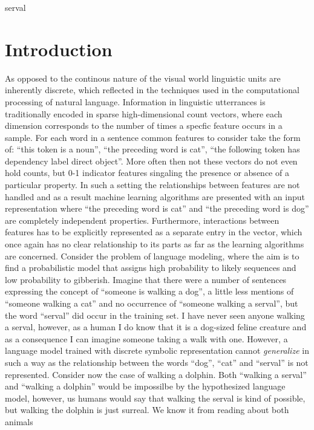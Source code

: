 
serval
\chapter{Introduction}
\label{introduction}
As opposed to the continous nature of the visual world linguistic units are inherently
discrete, which reflected in the techniques used in the computational processing
of natural language. Information in linguistic utterrances is traditionally encoded
in sparse high-dimensional count vectors, where each
dimension corresponds to the number of times a specfic feature occurs in a sample.
For each word in a sentence common features to consider take the form of:
``this token is a noun'', ``the preceding word is cat'',
``the following token has dependency label direct object''.
More often then not these vectors do not even hold counts, but 0-1 indicator features singaling
the presence or absence of a particular property.
In such a setting the relationships between features are not handled and
as a result machine learning algorithms are presented with an input representation where
``the preceding word is cat'' and ``the preceding word is dog''
are completely independent properties. Furthermore, interactions between features has to be
explicitly represented as a separate entry in the vector, which once again has no clear
relationship to its parts as far as the learning algorithms are concerned. Consider the problem
of language modeling, where the aim is to find a probabilistic model that assigns high probability
to likely sequences and low probability to gibberish.
Imagine that there were a number of sentences expressing the concept of ``someone is walking a dog'',
a little less mentions of ``someone walking a cat'' and no occurrence of ``someone walking a serval'',
but the word ``serval'' did occur in the training set.
I have never seen anyone walking a serval, however, as a human I do know that it is a dog-sized
feline creature and as a consequence I can imagine someone taking a walk with one. However, a language
model trained with discrete symbolic representation cannot \emph{generalize} in such a way as the
relationship between the words ``dog'', ``cat'' and ``serval'' is not represented. Consider now the
case of walking a dolphin. Both ``walking a serval'' and ``walking a dolphin'' would be impossilbe
by the hypothesized language model, however, us humans would say that walking the serval is
kind of possible, but walking the dolphin is just surreal. We know it from reading about both animals
